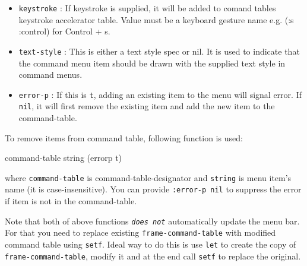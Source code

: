 \begin{itemize}
\begin{itemize}
  \item
    \texttt{keystroke} : If keystroke is supplied, it will be added to comand tables keystroke accelerator table. Value must be a keyboard gesture name e.g. (:s :control) for Control + s.
  \item
    \texttt{text-style} : This is either a text style spec or nil. It is used to indicate that the command menu item should be drawn with the supplied text style in command menus.
  \item
    \texttt{error-p} : If this is \texttt{t}, adding an existing item to the menu will signal error. If \texttt{nil}, it will first remove the existing item and add the new item to the command-table. 
  \end{itemize}
\end{itemize}

To remove items from command table, following function is used:

 {command-table string \key (errorp t)}

where \texttt{command-table} is command-table-designator and \texttt{string} is menu item's name (it is case-insensitive). You can provide \texttt{:error-p nil} to suppress the error if item is not in the command-table.

Note that both of above functions \texttt{\emph{does not}} automatically update the menu bar. For that you need to replace existing \texttt{frame-command-table} with modified command table using \texttt{setf}. Ideal way to do this is use \texttt{let} to create the copy of \texttt{frame-command-table}, modify it and at the end call \texttt{setf} to replace the original.





